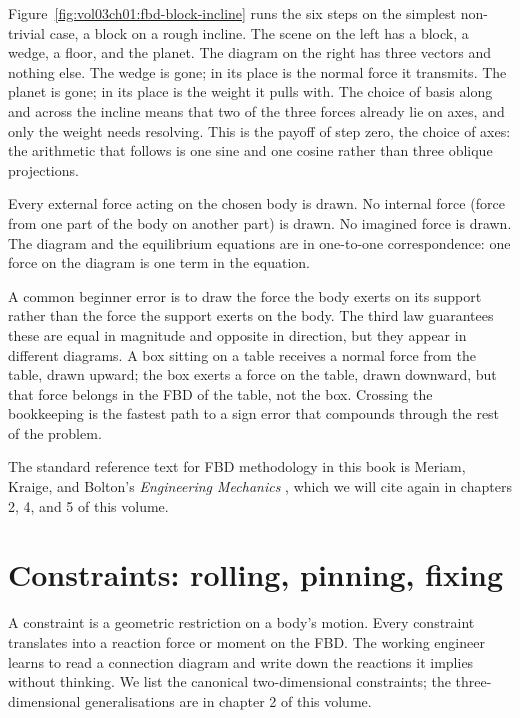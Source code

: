

Figure~\ref{fig:vol03ch01:fbd-block-incline} runs the six steps on the
simplest non-trivial case, a block on a rough incline. The scene on the
left has a block, a wedge, a floor, and the planet. The diagram on the
right has three vectors and nothing else. The wedge is gone; in its
place is the normal force it transmits. The planet is gone; in its
place is the weight it pulls with. The choice of basis along and across
the incline means that two of the three forces already lie on axes, and
only the weight needs resolving. This is the payoff of step zero, the
choice of axes: the arithmetic that follows is one sine and one cosine
rather than three oblique projections.

\begin{principle}
Every external force acting on the chosen body is drawn. No internal
force (force from one part of the body on another part) is drawn. No
imagined force is drawn. The diagram and the equilibrium equations are
in one-to-one correspondence: one force on the diagram is one term in
the equation.
\end{principle}

A common beginner error is to draw the force the body exerts on its
support rather than the force the support exerts on the body. The
third law guarantees these are equal in magnitude and opposite in
direction, but they appear in different diagrams. A box sitting on a
table receives a normal force from the table, drawn upward; the box
exerts a force on the table, drawn downward, but that force belongs in
the FBD of the table, not the box. Crossing the bookkeeping is the
fastest path to a sign error that compounds through the rest of the
problem.

The standard reference text for FBD methodology in this book is
Meriam, Kraige, and Bolton's \emph{Engineering Mechanics}
\cite{text:meriam-kraige2018}, which we will cite again in chapters 2,
4, and 5 of this volume.

\section{Constraints: rolling, pinning, fixing}

A constraint is a geometric restriction on a body's motion. Every
constraint translates into a reaction force or moment on the FBD. The
working engineer learns to read a connection diagram and write down the
reactions it implies without thinking. We list the canonical
two-dimensional constraints; the three-dimensional generalisations are
in chapter 2 of this volume.

